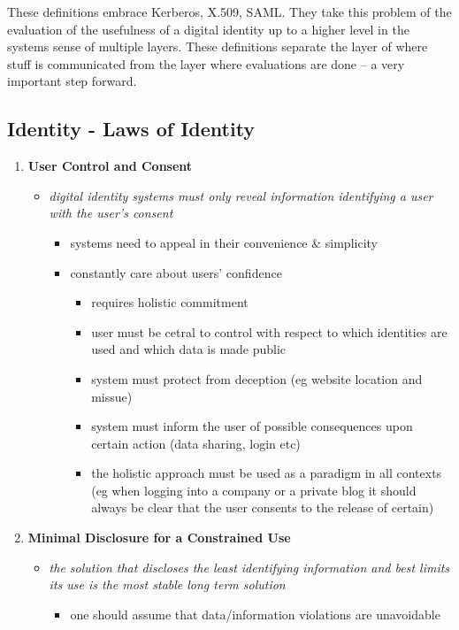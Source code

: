 \documentclass[11pt]{article}
\begin{document}
These definitions embrace Kerberos, X.509, SAML. They take this problem of the evaluation of the usefulness of a digital identity up to a higher level in the systems sense of multiple layers. These definitions separate the layer of where stuff is communicated from the layer where evaluations are done – a very important step forward.

\subsection{Identity - Laws of Identity}
\label{sec:orgd080492}
\begin{enumerate}
\item \textbf{User Control and Consent}
\begin{itemize}
\item \emph{digital identity systems must only reveal information identifying a user with the user's consent}
\begin{itemize}
\item systems need to appeal in their convenience \& simplicity
\item constantly care about users' confidence
\begin{itemize}
\item requires holistic commitment
\item user must be cetral to control with respect to which identities are used and which data is made public
\item system must protect from deception (eg website location and missue)
\item system must inform the user of possible consequences upon certain action (data sharing, login etc)
\item the holistic approach must be used as a paradigm in all contexts (eg when logging into a company or a private blog it should always be clear that the user consents to the release of certain)
\end{itemize}
\end{itemize}
\end{itemize}
\item \textbf{Minimal Disclosure for a Constrained Use}
\begin{itemize}
\item \emph{the solution that discloses the least identifying information and best limits its use is the most stable long term solution}
\begin{itemize}
\item one should assume that data/information violations are unavoidable

\end{itemize}
\end{itemize}
\end{enumerate}
\end{document}
